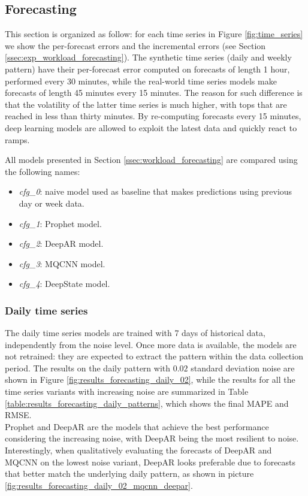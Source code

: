 \documentclass[a4paper, 12pt]{article} %
\begin{document}
	\clearpage
	\subsection{Forecasting} \label{ssec:results_forecasting}
	This section is organized as follow: for each time series in Figure \ref{fig:time_series} we show the per-forecast errors and the incremental errors (see Section \ref{ssec:exp_workload_forecasting}). 
	The synthetic time series (daily and weekly pattern) have their per-forecast error computed on forecasts of length 1 hour, performed every 30 minutes, while the real-world time series models make forecasts of length 45 minutes every 15 minutes. The reason for such difference is that the volatility of the latter time series is much higher, with tops that are reached in less than thirty minutes. By re-computing forecasts every 15 minutes, deep learning models are allowed to exploit the latest data and quickly react to ramps.
	
	All models presented in Section \ref{ssec:workload_forecasting} are compared using the following names:
	\begin{itemize}
		\item \textit{cfg\_0}: naive model used as baseline that makes predictions using previous day or week data.
		\item \textit{cfg\_1}: Prophet model.
		\item \textit{cfg\_2}: DeepAR model.
		\item \textit{cfg\_3}: MQCNN model.
		\item \textit{cfg\_4}: DeepState model.
	\end{itemize}
	
	\subsubsection{Daily time series} \label{sssec:results_forecasting_daily}
	The daily time series models are trained with 7 days of historical data, independently from the noise level. Once more data is available, the models are not retrained: they are expected to extract the pattern within the data collection period.  The results on the daily pattern with $0.02$ standard deviation noise are shown in Figure \ref{fig:results_forecasting_daily_02}, while the results for all the time series variants with increasing noise are summarized in Table \ref{table:results_forecasting_daily_patterns}, which shows the final MAPE and RMSE.\\ 
	Prophet and DeepAR are the models that achieve the best performance considering the increasing noise, with DeepAR being the most resilient to noise. Interestingly, when qualitatively evaluating the forecasts of DeepAR and MQCNN on the lowest noise variant, DeepAR looks preferable due to forecasts that better match the underlying daily pattern, as shown in picture \ref{fig:results_forecasting_daily_02_mqcnn_deepar}. 
	
\end{document}
